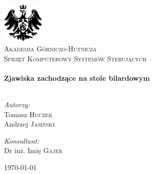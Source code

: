 \begin{titlepage}

\begin{center}

\includegraphics[width=0.15\textwidth]{./img/logo.eps}\\[1cm]

\textsc{\LARGE Akademia Górniczo-Hutnicza}\\[1.5cm]

\textsc{\Large Sprzęt Komputerowy Systemów Sterujących}\\[0.5cm]


\HRule \\[0.4cm]
{ \huge \bfseries Zjawiska zachodzące na stole bilardowym}\\[0.4cm]

\HRule \\[1.5cm]

\begin{minipage}{0.4\textwidth}
\begin{flushleft} \large
\emph{Autorzy:}\\
Tomasz \textsc{Huczek}\\
Andrzej \textsc{Jasiński}
\end{flushleft}
\end{minipage}
\begin{minipage}{0.4\textwidth}
\begin{flushright} \large
\emph{Konsultant:} \\
Dr inż. Imię \textsc{Gajer}
\end{flushright}
\end{minipage}

\vfill

{\large \today}

\end{center}

\end{titlepage}
